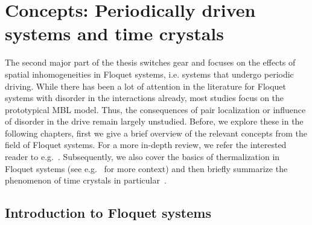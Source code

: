 \chapter{Concepts: Periodically driven systems and time crystals}\label{ch:introduction-floquet}

The second major part of the thesis switches gear and focuses on the effects of spatial inhomogeneities in Floquet systems, i.e. systems that undergo periodic driving. While there has been a lot of attention in the literature for Floquet systems with disorder in the interactions already, most studies focus on the prototypical MBL model. Thus, the consequences of pair localization or influence of disorder in the drive remain largely unstudied. Before, we explore these in the following chapters, first we give a brief overview of the relevant concepts from the field of Floquet systems. For a more in-depth review, we refer the interested reader to e.g.~\cite{eckardtColloquiumAtomicQuantum2017}. Subsequently, we also cover the basics of thermalization in Floquet systems (see e.g.~\cite{moriThermalizationPrethermalizationIsolated2018} for more context) and then briefly summarize the phenomenon of time crystals in particular~\cite{elseFloquetTimeCrystals2016,khemaniBriefHistoryTime2019,elseDiscreteTimeCrystals2020a}.



\section{Introduction to Floquet systems}


